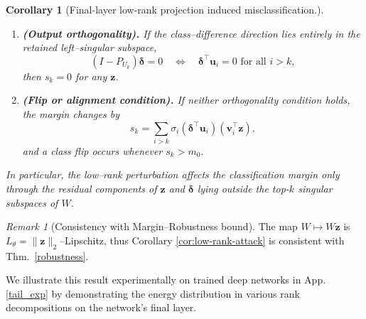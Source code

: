 \documentclass{article}
\theoremstyle{plain}
\newtheorem{corollary}[theorem]{Corollary}
\theoremstyle{definition}
\theoremstyle{remark}
\newtheorem{remark}[theorem]{Remark}
\begin{document}
\begin{corollary}[Final-layer low-rank projection induced misclassification.]
\begin{enumerate}
  \item \textbf{(Output orthogonality).}
  If the class–difference direction lies entirely in the retained left–singular subspace,
  \[
  (I - P_{U_k})\boldsymbol{\delta} = 0 
  \quad \Leftrightarrow \quad
  \boldsymbol{\delta}^\top \mathbf u_i = 0 \text{ for all } i > k,
  \]
  then $s_k = 0$ for any $\mathbf z$.

  \item \textbf{(Flip or alignment condition).}
  If neither orthogonality condition holds, the margin changes by
  \[
  s_k = \sum_{i>k} \sigma_i (\boldsymbol{\delta}^\top \mathbf u_i)(\mathbf v_i^\top \mathbf z),
  \]
  and a class flip occurs whenever
  \(
  s_k > m_0.
  \)
\end{enumerate}

In particular, the low–rank perturbation affects the classification margin
only through the residual components of $\mathbf z$ and $\boldsymbol{\delta}$ lying outside 
the top-$k$ singular subspaces of $W$.
\end{corollary}

\begin{remark}[Consistency with Margin–Robustness bound]
The map $W\mapsto W\mathbf z$ is $L_\theta=\|\mathbf z\|_2$–Lipschitz, thus Corollary \ref{cor:low-rank-attack} is consistent with Thm.~\ref{robustness}.
\end{remark}

We illustrate this result experimentally  on trained deep networks in App. \ref{tail_exp} by demonstrating the energy distribution in various rank decompositions on the network's final layer.
\end{document}
